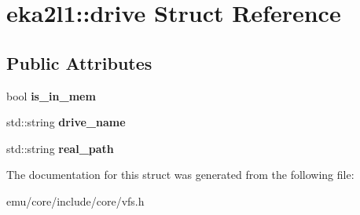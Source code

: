 \hypertarget{structeka2l1_1_1drive}{}\section{eka2l1\+:\+:drive Struct Reference}
\label{structeka2l1_1_1drive}
\subsection*{Public Attributes}
\begin{DoxyCompactItemize}
\item 
\mbox{\label{structeka2l1_1_1drive_add1f50fbf36a04159ad584f443f30c78}} 
bool {\bfseries is\+\_\+in\+\_\+mem}
\item 
\mbox{\label{structeka2l1_1_1drive_a1f1c9a59fe23aba6a12f891d53bc513e}} 
std\+::string {\bfseries drive\+\_\+name}
\item 
\mbox{\label{structeka2l1_1_1drive_ab3f183fe162652768d10e7a195edb5e1}} 
std\+::string {\bfseries real\+\_\+path}
\end{DoxyCompactItemize}


The documentation for this struct was generated from the following file\+:\begin{DoxyCompactItemize}
\item 
emu/core/include/core/vfs.\+h\end{DoxyCompactItemize}
